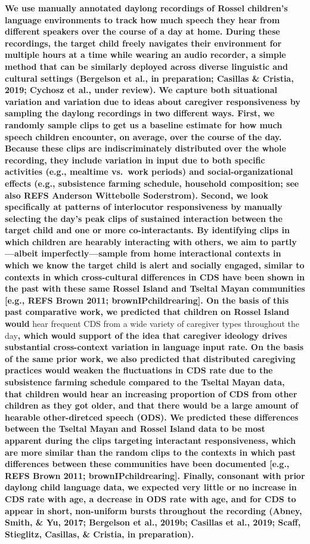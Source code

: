 \documentclass[,man,floatsintext]{apa6}
\begin{document}
\textbf{We use manually annotated daylong recordings of Rossel
children's language environments to track how much speech they hear from
different speakers over the course of a day at home. During these
recordings, the target child freely navigates their environment for
multiple hours at a time while wearing an audio recorder, a simple
method that can be similarly deployed across diverse linguistic and
cultural settings (Bergelson et al., in preparation; Casillas \&
Cristia, 2019; Cychosz et al., under review). We capture both
situational variation and variation due to ideas about caregiver
responsiveness by sampling the daylong recordings in two different ways.
First, we randomly sample clips to get us a baseline estimate for how
much speech children encounter, on average, over the course of the day.
Because these clips are indiscriminately distributed over the whole
recording, they include variation in input due to both specific
activities (e.g., mealtime vs.~work periods) and social-organizational
effects (e.g., subsistence farming schedule, household composition; see
also REFS Anderson Wittebolle Soderstrom). Second, we look specifically
at patterns of interlocutor responsiveness by manually selecting the
day's peak clips of sustained interaction between the target child and
one or more co-interactants. By identifying clips in which children are
hearably interacting with others, we aim to partly---albeit
imperfectly---sample from home interactional contexts in which we know
the target child is alert and socially engaged, similar to contexts in
which cross-cultural differences in CDS have been shown in the past with
these same Rossel Island and Tseltal Mayan communities {[}e.g., REFS
Brown 2011; brownIPchildrearing{]}. On the basis of this past
comparative work, we predicted that children on Rossel Island would}
hear frequent CDS from a wide variety of caregiver types throughout the
day\textbf{, which would support of the idea that caregiver ideology
drives substantial cross-context variation in language input rate. On
the basis of the same prior work, we also predicted that distributed
caregiving practices would weaken the fluctuations in CDS rate due to
the subsistence farming schedule compared to the Tseltal Mayan data,
that children would hear an increasing proportion of CDS from other
children as they got older, and that there would be a large amount of
hearable other-diretced speech (ODS). We predicted these differences
between the Tseltal Mayan and Rossel Island data to be most apparent
during the clips targeting interactant responsiveness, which are more
similar than the random clips to the contexts in which past differences
between these communities have been documented {[}e.g., REFS Brown 2011;
brownIPchildrearing{]}. Finally, consonant with prior daylong child
language data, we expected very little or no increase in CDS rate with
age, a decrease in ODS rate with age, and for CDS to appear in short,
non-uniform bursts throughout the recording (Abney, Smith, \& Yu, 2017;
Bergelson et al., 2019b; Casillas et al., 2019; Scaff, Stieglitz,
Casillas, \& Cristia, in preparation).}
\end{document}
